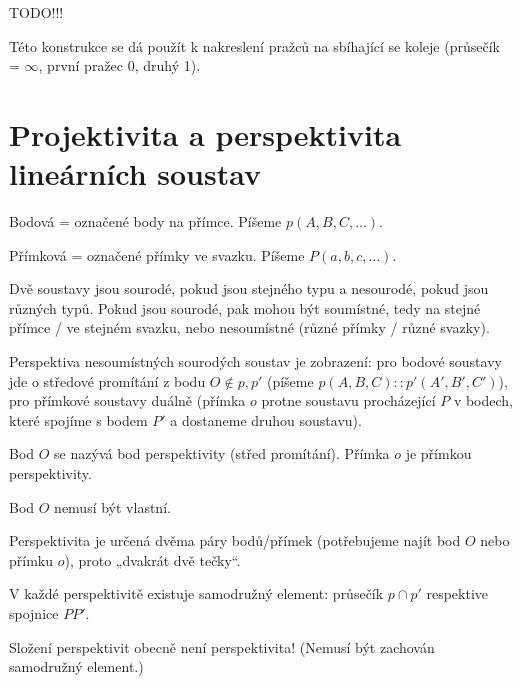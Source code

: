 \documentclass[12pt]{article}					%
\begin{document}
TODO!!!

\begin{poznamka}
	Této konstrukce se dá použít k nakreslení pražců na sbíhající se koleje (průsečík = $∞$, první pražec 0, druhý 1).
\end{poznamka}

\section{Projektivita a perspektivita lineárních soustav}
\begin{definice}[Soustava]
	Bodová = označené body na přímce. Píšeme $p(A, B, C, …)$.

	Přímková = označené přímky ve svazku. Píšeme $P(a, b, c, …)$.

	Dvě soustavy jsou sourodé, pokud jsou stejného typu a nesourodé, pokud jsou různých typů. Pokud jsou sourodé, pak mohou být soumístné, tedy na stejné přímce / ve stejném svazku, nebo nesoumístné (různé přímky / různé svazky).
\end{definice}

\begin{definice}[Perspektiva]
	Perspektiva nesoumístných sourodých soustav je zobrazení: pro bodové soustavy jde o středové promítání z bodu $O \notin p, p'$ (píšeme $p(A, B, C)::p'(A', B', C')$), pro přímkové soustavy duálně (přímka $o$ protne soustavu procházející $P$ v bodech, které spojíme s bodem $P'$ a dostaneme druhou soustavu).

	Bod $O$ se nazývá bod perspektivity (střed promítání). Přímka $o$ je přímkou perspektivity.

	\begin{poznamkain}
		Bod $O$ nemusí být vlastní.
	\end{poznamkain}

	\begin{poznamkain}[Značení $::$]
		Perspektivita je určená dvěma páry bodů/přímek (potřebujeme najít bod $O$ nebo přímku $o$), proto „dvakrát dvě tečky“.
	\end{poznamkain}
\end{definice}

\begin{dusledek}
	V každé perspektivitě existuje samodružný element: průsečík $p \cap p'$ respektive spojnice $P P'$.
\end{dusledek}

\begin{upozorneni}
	Složení perspektivit obecně není perspektivita! (Nemusí být zachován samodružný element.)
\end{upozorneni}
\end{document}
